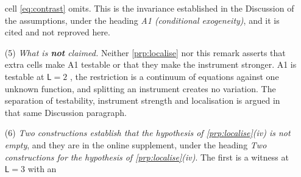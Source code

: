 \begin{remark}
\begin{enumerate}
cell \eqref{eq:contrast} omits. This is the invariance established in the Discussion of the assumptions,
under the heading \emph{A1 (conditional exogeneity)}, and it is cited and not reproved here.
\item[(5)] \emph{What is \textbf{not} claimed.} Neither \cref{prp:localise} nor this remark asserts that
extra cells make A1 testable or that they make the instrument stronger. A1 is testable at $\mathsf L=2$
, the restriction is a continuum of equations against one unknown function, and splitting an
instrument creates no variation. The separation of testability, instrument strength and localisation is
argued in that same Discussion paragraph.
\item[(6)] \emph{Two constructions establish that the hypothesis of \cref{prp:localise}\textup{(iv)} is
not empty}, and they are in the online supplement, under the heading \emph{Two constructions for the
hypothesis of \cref{prp:localise}\textup{(iv)}}. The first is a witness at $\mathsf L=3$ with an

\end{enumerate}
\end{remark}

